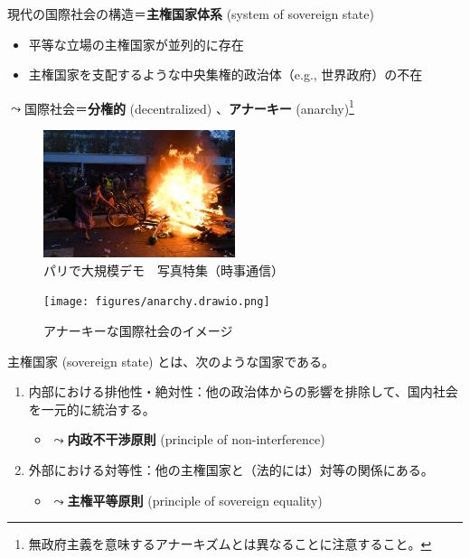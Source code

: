 \documentclass[
  xelatex,
  ja=standard]{bxjsarticle}
\providecommand{\tightlist}{%
  \setlength{\itemsep}{0pt}\setlength{\parskip}{0pt}}\usepackage{longtable,booktabs,array}
\begin{document}
現代の国際社会の構造＝\textbf{主権国家体系} (system of sovereign state)

\begin{itemize}
\tightlist
\item
  平等な立場の主権国家が並列的に存在
\item
  主権国家を支配するような中央集権的政治体（e.g., 世界政府）の不在
\end{itemize}

\(\leadsto\)国際社会＝\textbf{分権的} (decentralized)
、\textbf{アナーキー} (anarchy)\footnote{無政府主義を意味するアナーキズムとは異なることに注意すること。}

\begin{figure}[htpb]

{\centering \includegraphics[width=0.5\textwidth,height=\textheight]{international_society_files/mediabag/pmb805-jpp033367028.jpg}

}

\caption{パリで大規模デモ　写真特集（時事通信）}

\end{figure}

\begin{figure}[htpb]

{\centering \texttt{[image: figures/anarchy.drawio.png]}

}

\caption{アナーキーな国際社会のイメージ}

\end{figure}

主権国家 (sovereign state) とは、次のような国家である。

\begin{enumerate}
\def\labelenumi{\arabic{enumi}.}
\tightlist
\item
  内部における排他性・絶対性：他の政治体からの影響を排除して、国内社会を一元的に統治する。

  \begin{itemize}
  \tightlist
  \item
    \(\leadsto\)\textbf{内政不干渉原則} (principle of non-interference)
  \end{itemize}
\item
  外部における対等性：他の主権国家と（法的には）対等の関係にある。

  \begin{itemize}
  \tightlist
  \item
    \(\leadsto\)\textbf{主権平等原則} (principle of sovereign equality)
  \end{itemize}
\end{enumerate}
\end{document}
